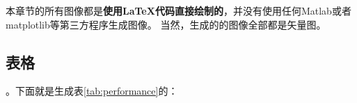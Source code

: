 \documentclass[UTF8]{ctexart}
\numberwithin{equation}{section} %
\numberwithin{table}{section} %
\begin{document}
%

本章节的所有图像都是\textbf{使用\LaTeX 代码直接绘制的}，并没有使用任何Matlab或者matplotlib等第三方程序生成图像。
当然，生成的的图像全部都是矢量图。

\subsection{表格}
。下面就是生成表\ref{tab:performance}的：
\end{document}
